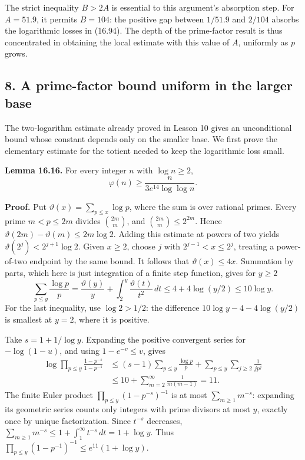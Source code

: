 \documentclass[
  11pt,
  a4paper,
]{article}
\begin{document}
The strict inequality \(B>2A\) is essential to this argument's
absorption step. For \(A=51.9\), it permits \(B=104\): the positive gap
between \(1/51.9\) and \(2/104\) absorbs the logarithmic losses in
(16.94). The depth of the prime-factor result is thus concentrated in
obtaining the local estimate with this value of \(A\), uniformly as
\(p\) grows.

\subsection{8. A prime-factor bound uniform in the larger
base}\label{a-prime-factor-bound-uniform-in-the-larger-base}

The two-logarithm estimate already proved in Lesson 10 gives an
unconditional bound whose constant depends only on the smaller base. We
first prove the elementary estimate for the totient needed to keep the
logarithmic loss small.

\textbf{Lemma 16.16.} For every integer \(n\) with \(\log n\ge2\), \[
 \varphi(n)\ge\frac{n}{3e^{14}\log\log n}.
 \tag{16.95}
\]

\textbf{Proof.} Put \(\vartheta(x)=\sum_{p\le x}\log p\), where the sum
is over rational primes. Every prime \(m<p\le2m\) divides
\(\binom{2m}{m}\), and \(\binom{2m}{m}\le2^{2m}\). Hence
\(\vartheta(2m)-\vartheta(m)\le2m\log2\). Adding this estimate at powers
of two yields \(\vartheta(2^j)<2^{j+1}\log2\). Given \(x\ge2\), choose
\(j\) with \(2^{j-1}<x\le2^j\), treating a power-of-two endpoint by the
same bound. It follows that \(\vartheta(x)\le4x\). Summation by parts,
which here is just integration of a finite step function, gives for
\(y\ge2\) \[
 \sum_{p\le y}\frac{\log p}{p}
 =\frac{\vartheta(y)}y+\int_2^y\frac{\vartheta(t)}{t^2}\,dt
 \le4+4\log(y/2)\le10\log y.
\] For the last inequality, use \(\log2>1/2\): the difference
\(10\log y-4-4\log(y/2)\) is smallest at \(y=2\), where it is positive.

Take \(s=1+1/\log y\). Expanding the positive convergent series for
\(-\log(1-u)\), and using \(1-e^{-v}\le v\), gives \[
 \begin{split}
 \log\prod_{p\le y}\frac{1-p^{-s}}{1-p^{-1}}
 &\le(s-1)\sum_{p\le y}\frac{\log p}{p}
       +\sum_{p\le y}\sum_{j\ge2}\frac1{jp^j}\\
 &\le10+\sum_{m=2}^{\infty}\frac1{m(m-1)}=11.
 \end{split}
 \tag{16.96}
\] The finite Euler product \(\prod_{p\le y}(1-p^{-s})^{-1}\) is at most
\(\sum_{m\ge1}m^{-s}\): expanding its geometric series counts only
integers with prime divisors at most \(y\), exactly once by unique
factorization. Since \(t^{-s}\) decreases,
\(\sum_{m\ge1}m^{-s}\le1+\int_1^\infty t^{-s}\,dt=1+\log y\). Thus
\(\prod_{p\le y}(1-p^{-1})^{-1}\le e^{11}(1+\log y)\).
\end{document}
